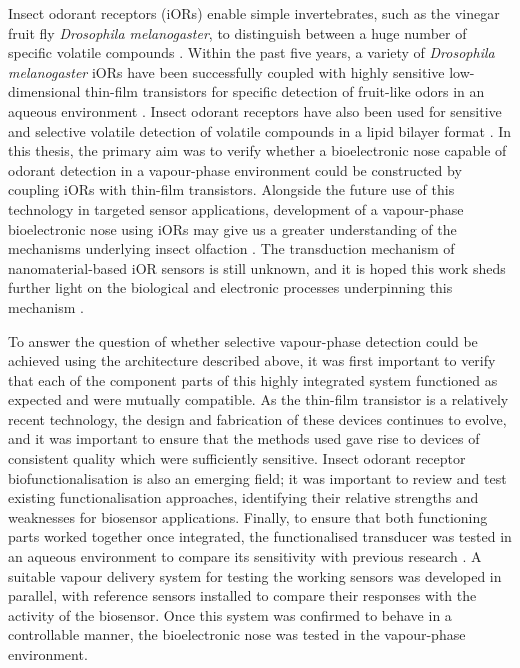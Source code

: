 \documentclass[
  a4paper,
]{scrbook}
\begin{document}
Insect odorant receptors (iORs) enable simple invertebrates, such as the
vinegar fruit fly \emph{Drosophila melanogaster}, to distinguish between
a huge number of specific volatile compounds
\autocite{Hallem2004,Smart2008,Wicher2008,Munch2016,Bohbot2020}. Within
the past five years, a variety of \emph{Drosophila melanogaster} iORs
have been successfully coupled with highly sensitive low-dimensional
thin-film transistors for specific detection of fruit-like odors in an
aqueous environment \autocite{Murugathas2019a,Murugathas2020}. Insect
odorant receptors have also been used for sensitive and selective
volatile detection of volatile compounds in a lipid bilayer format
\autocite{Yamada2021}. In this thesis, the primary aim was to verify
whether a bioelectronic nose capable of odorant detection in a
vapour-phase environment could be constructed by coupling iORs with
thin-film transistors. Alongside the future use of this technology in
targeted sensor applications, development of a vapour-phase
bioelectronic nose using iORs may give us a greater understanding of the
mechanisms underlying insect olfaction \autocite{Lee2010}. The
transduction mechanism of nanomaterial-based iOR sensors is still
unknown, and it is hoped this work sheds further light on the biological
and electronic processes underpinning this mechanism
\autocite{Murugathas2020,Khadka2019,Cheema2021}.

To answer the question of whether selective vapour-phase detection could
be achieved using the architecture described above, it was first
important to verify that each of the component parts of this highly
integrated system functioned as expected and were mutually compatible.
As the thin-film transistor is a relatively recent technology, the
design and fabrication of these devices continues to evolve, and it was
important to ensure that the methods used gave rise to devices of
consistent quality which were sufficiently sensitive. Insect odorant
receptor biofunctionalisation is also an emerging field; it was
important to review and test existing functionalisation approaches,
identifying their relative strengths and weaknesses for biosensor
applications. Finally, to ensure that both functioning parts worked
together once integrated, the functionalised transducer was tested in an
aqueous environment to compare its sensitivity with previous research
\autocite{Murugathas2019a,Murugathas2020}. A suitable vapour delivery
system for testing the working sensors was developed in parallel, with
reference sensors installed to compare their responses with the activity
of the biosensor. Once this system was confirmed to behave in a
controllable manner, the bioelectronic nose was tested in the
vapour-phase environment.
\end{document}
